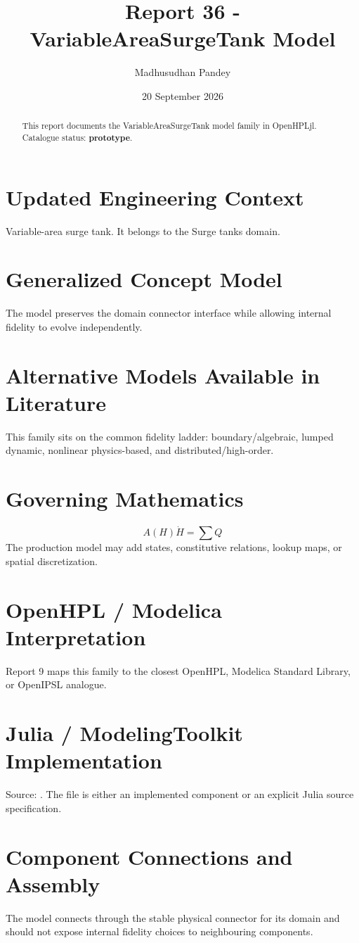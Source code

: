 \documentclass[10pt,a4paper]{article}
\title{Report 36 - VariableAreaSurgeTank Model}
\author{Madhusudhan Pandey}
\date{20 September 2026}
\begin{document}
\maketitle
\begin{abstract}This report documents the VariableAreaSurgeTank model family in OpenHPLjl. Catalogue status: \textbf{prototype}.\end{abstract}
\section{Updated Engineering Context}Variable-area surge tank. It belongs to the Surge tanks domain.
\section{Generalized Concept Model}The model preserves the domain connector interface while allowing internal fidelity to evolve independently.
\section{Alternative Models Available in Literature}This family sits on the common fidelity ladder: boundary/algebraic, lumped dynamic, nonlinear physics-based, and distributed/high-order.
\section{Governing Mathematics}\[A(H)\dot H=\sum Q\]The production model may add states, constitutive relations, lookup maps, or spatial discretization.
\section{OpenHPL / Modelica Interpretation}Report 9 maps this family to the closest OpenHPL, Modelica Standard Library, or OpenIPSL analogue.
\section{Julia / ModelingToolkit Implementation}Source: \texttt{}. The file is either an implemented component or an explicit Julia source specification.
\section{Component Connections and Assembly}The model connects through the stable physical connector for its domain and should not expose internal fidelity choices to neighbouring components.
\end{document}

